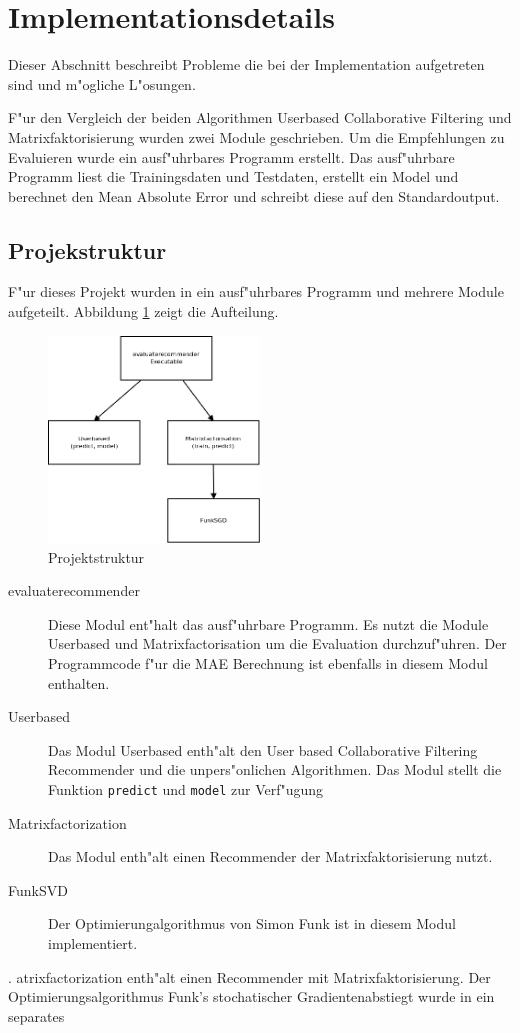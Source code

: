\documentclass[a4paper, 12pt]{article}
\begin{document}
\section{Implementationsdetails}
\label{sec:ram}

Dieser Abschnitt beschreibt Probleme die bei der Implementation aufgetreten sind und m"ogliche L"osungen.

F"ur den Vergleich der beiden Algorithmen Userbased Collaborative Filtering und Matrixfaktorisierung wurden zwei Module geschrieben. Um die Empfehlungen zu Evaluieren wurde ein ausf"uhrbares Programm erstellt. Das ausf"uhrbare Programm liest die Trainingsdaten und Testdaten, erstellt ein Model und berechnet den Mean Absolute Error und schreibt diese auf den Standardoutput.

\subsection{Projekstruktur}
\label{sec:structur}

F"ur dieses Projekt wurden in ein ausf"uhrbares Programm und mehrere Module aufgeteilt. Abbildung \ref{fig:structur} zeigt die Aufteilung.

\begin{figure}
  \centering
      \includegraphics[width=0.5\textwidth]{structur}
  \caption{Projektstruktur}
  \label{fig:structur}
\end{figure}

\begin{description}
\item[evaluaterecommender] Diese Modul ent"halt das ausf"uhrbare Programm. Es nutzt die Module Userbased und Matrixfactorisation um die Evaluation durchzuf"uhren. Der Programmcode f"ur die MAE Berechnung ist ebenfalls in diesem Modul enthalten.
\item[Userbased] Das Modul Userbased enth"alt den User based Collaborative Filtering Recommender und die unpers"onlichen Algorithmen. Das Modul stellt die Funktion \verb|predict| und \verb|model| zur Verf"ugung
\item[Matrixfactorization] Das Modul enth"alt einen Recommender der Matrixfaktorisierung nutzt.
\item[FunkSVD] Der Optimierungalgorithmus von Simon Funk ist in diesem Modul implementiert.
\end{description}
.
atrixfactorization enth"alt einen Recommender mit Matrixfaktorisierung. Der Optimierungsalgorithmus Funk's stochatischer Gradientenabstiegt wurde in ein separates 
\end{document}
